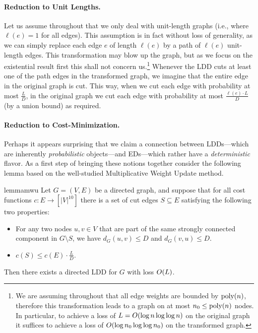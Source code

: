 \paragraph{Reduction to Unit Lengths.}
Let us assume throughout that we only deal with unit-length graphs (i.e., where $\ell(e) = 1$ for all edges). This assumption is in fact without loss of generality, as we can simply replace each edge $e$ of length $\ell(e)$ by a path of $\ell(e)$ unit-length edges. This transformation may blow up the graph, but as we focus on the existential result first this shall not concern us.\footnote{We are assuming throughout that all edge weights are bounded by $\operatorname{\text{{\rm poly}}}(n)$, therefore this transformation leads to a graph on at most $n_0 \leq \operatorname{\text{{\rm poly}}}(n)$ nodes. In particular, to achieve a loss of $L = O(\log n \log \log n)$ on the original graph it suffices to achieve a loss of $O(\log n_0 \log\log n_0)$ on the transformed graph.} Whenever the LDD cuts at least one of the path edges in the transformed graph, we imagine that the entire edge in the original graph is cut. This way, when we cut each edge with probability at most $\frac{L}{D}$, in the original graph we cut each edge with probability at most $\frac{\ell(e) \cdot L}{D}$ (by a union bound) as required.

\paragraph{Reduction to Cost-Minimization.}
Perhaps it appears surprising that we claim a connection between LDDs---which are inherently \emph{probabilistic} objects---and EDs---which rather have a \emph{deterministic} flavor. As a first step of bringing these notions together consider the following lemma based on the well-studied Multiplicative Weight Update \cite{AroraHazanKale12} method.
 

\begin{restatable}{lemma}{mwu} \label{lem:mwu}
Let $G = (V, E)$ be a directed graph, and suppose that for all cost functions $c : E \to [|V|^{10}]$ there is a set of cut edges $S \subseteq E$ satisfying the following two properties:
\begin{itemize}
	\item For any two nodes $u, v \in V$ that are part of the same strongly connected component in $G \setminus S$, we have $d_G(u, v) \leq D$ and $d_G(v, u) \leq D$.
	\item $c(S) \leq c(E) \cdot \frac{L}{D}$.
\end{itemize}
Then there exists a directed LDD for $G$ with loss $O(L)$.
\end{restatable}

